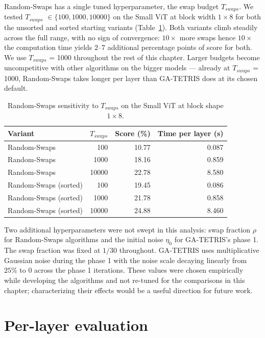 Random-Swaps has a single tuned hyperparameter, the swap budget $T_{swaps}$. We tested $T_{swaps}$ $\in \{100, 1000, 10000\}$ on the Small ViT at block width $1 \times 8$ for both the unsorted and sorted starting variants (Table~\ref{tab:random_swaps_times}). Both variants climb steadily across the full range, with no sign of convergence: $10\times$ more swaps hence $10\times$ the computation time yields $2$--$7$ additional percentage points of score for both. We use $T_{swaps}$ = 1000 throughout the rest of this chapter. Larger budgets become uncompetitive with other algorithms on the bigger models --- already at $T_{swaps}$ = 1000, Random-Swaps takes longer per layer than GA-TETRIS does at its chosen default.

\begin{table}[htbp]
    \centering
    \caption{Random-Swaps sensitivity to $T_{swaps}$ on the Small ViT at block shape $1 \times 8$.}
    \label{tab:random_swaps_times}
    \medskip
    \begin{tabular}{l r r r}
        \toprule
        Variant & $T_{swaps}$ & Score (\%) & Time per layer (s) \\
        \midrule
        Random-Swaps          & 100      & 10.77 & 0.087 \\
        Random-Swaps          & 1000  & 18.16 & 0.859 \\
        Random-Swaps          & 10000 & 22.78 & 8.580 \\
        \midrule
        Random-Swaps (sorted) & 100      & 19.45 & 0.086 \\
        Random-Swaps (sorted) & 1000  & 21.78 & 0.858 \\
        Random-Swaps (sorted) & 10000 & 24.88 & 8.460 \\
        \bottomrule
    \end{tabular}
\end{table}


Two additional hyperparameters were not swept in this analysis: swap fraction $\rho$ for Random-Swaps algorithms and the initial noise $\eta_0$ for GA-TETRIS's phase 1. The swap fraction was fixed at $1/30$ throughout. GA-TETRIS uses multiplicative Gaussian noise during the phase 1 with the noise scale decaying linearly from $25\%$ to $0$ across the phase 1 iterations. These values were chosen empirically while developing the algorithms and not re-tuned for the comparisons in this chapter; characterizing their effects would be a useful direction for future work.

\section{Per-layer evaluation}
\label{sec:per_layer}

